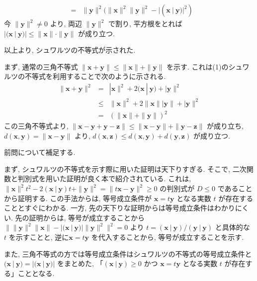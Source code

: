 \documentclass[dvipdfmx,a4j]{jarticle}
\newcounter{pn}     %
\let\np\newpage
\renewcommand{\newpage}{
    \np
    \addtocounter{pn}{1}
}
\begin{document}
{\begin{enumerate}
\begin{eqnarray*}
        &=& \|\bm{y}\|^2(\|\bm{x}\|^2\|\bm{y}\|^2 - |(\bm{x}\ |\ \bm{y})|^2)
    \end{eqnarray*}
    今 $\|\bm{y}\|^2 \neq 0$ より, 両辺 $\|\bm{y}\|^2$ で割り, 平方根をとれば $|(\bm{x}\ |\ \bm{y})| \leq \|\bm{x}\|\cdot \|\bm{y}\|$ が成り立つ.
\end{enumerate}
以上より, シュワルツの不等式が示された.
\item まず, 通常の三角不等式 $\|\bm{x} + \bm{y}\| \leq \|\bm{x}\| + \|\bm{y}\|$ を示す.
これは(1)のシュワルツの不等式を利用することで次のように示される.
\begin{eqnarray*}
    \|\bm{x} + \bm{y}\|^2 &=& |\bm{x}\|^2 + 2(\bm{x}\ |\ \bm{y}) + |\bm{y}\|^2\\
    &\leq& \|\bm{x}\|^2 + 2\|\bm{x}\||\bm{y}\| + |\bm{y}\|^2\\
    &=& (\|\bm{x}\| + \|\bm{y}\|)^2
\end{eqnarray*}
この三角不等式より, $\|\bm{x} - \bm{y} + \bm{y} - \bm{z}\| \leq \|\bm{x} -\bm{y}\| + \|\bm{y} - \bm{z}\|$ が成り立ち, $d(\bm{x}, \bm{y}) = \|\bm{x} - \bm{y}\|$ より, 
$d(\bm{x}, \bm{z}) \leq d(\bm{x}, \bm{y}) + d(\bm{y}, \bm{z})$ が成り立つ.
}
\newpage
前問について補足する.

まず, シュワルツの不等式を示す際に用いた証明は天下りすぎる. そこで, 二次関数と判別式を用いた証明が良く本で紹介されている.
これは, $\|\bm{x}\|^2t^2 - 2(\bm{x}\ |\ \bm{y})t + \|\bm{y}\|^2 = \| t\bm{x} - \bm{y}\|^2 \geq 0$ の判別式が $D \leq 0$ であることから証明する.
この手法からは, 等号成立条件が $\bm{x} = t\bm{y}$ となる実数 $t$ が存在することとすぐにわかる. 一方, 先の天下りな証明からは等号成立条件はわかりにくい.
先の証明からは, 等号が成立することから $\| \|\bm{y}\|^2\|\bm{x}\| - |(\bm{x}\ |\ \bm{y})| \|\bm{y}\|^2 \|^2 = 0$ より $t = (\bm{x}\ |\ \bm{y})/(\bm{y}\ |\ \bm{y})$ と具体的な $t$ を示すことと, 
逆に$\bm{x} = t\bm{y}$ を代入することから, 等号が成立することを示す. 

また, 三角不等式の方では等号成立条件はシュワルツの不等式の等号成立条件と $(\bm{x}\ |\ \bm{y}) = |(\bm{x}\ |\ \bm{y})|$ をまとめた, 
「$(\bm{x}\ |\ \bm{y}) \geq 0$ かつ $\bm{x} = t\bm{y}$ となる実数 $t$ が存在する」こととなる.
\end{document}
